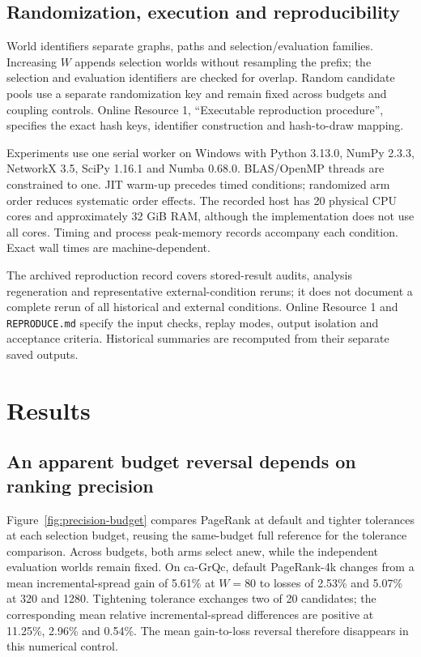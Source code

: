 \documentclass[smallextended]{svjour3}
\begin{document}
\subsection{Randomization, execution and reproducibility}
World identifiers separate graphs, paths and selection/evaluation families. Increasing $W$ appends selection worlds without resampling the prefix; the selection and evaluation identifiers are checked for overlap. Random candidate pools use a separate randomization key and remain fixed across budgets and coupling controls. Online Resource 1, ``Executable reproduction procedure'', specifies the exact hash keys, identifier construction and hash-to-draw mapping.

Experiments use one serial worker on Windows with Python 3.13.0, NumPy 2.3.3, NetworkX 3.5, SciPy 1.16.1 and Numba 0.68.0. BLAS/OpenMP threads are constrained to one. JIT warm-up precedes timed conditions; randomized arm order reduces systematic order effects. The recorded host has 20 physical CPU cores and approximately 32 GiB RAM, although the implementation does not use all cores. Timing and process peak-memory records accompany each condition. Exact wall times are machine-dependent.

The archived reproduction record covers stored-result audits, analysis regeneration and representative external-condition reruns; it does not document a complete rerun of all historical and external conditions. Online Resource 1 and \texttt{REPRODUCE.md} specify the input checks, replay modes, output isolation and acceptance criteria. Historical summaries are recomputed from their separate saved outputs.

\section{Results}
\subsection{An apparent budget reversal depends on ranking precision}
Figure~\ref{fig:precision-budget} compares PageRank at default and tighter tolerances at each selection budget, reusing the same-budget full reference for the tolerance comparison. Across budgets, both arms select anew, while the independent evaluation worlds remain fixed. On ca-GrQc, default PageRank-4k changes from a mean incremental-spread gain of 5.61\% at $W=80$ to losses of 2.53\% and 5.07\% at 320 and 1280. Tightening tolerance exchanges two of 20 candidates; the corresponding mean relative incremental-spread differences are positive at 11.25\%, 2.96\% and 0.54\%. The mean gain-to-loss reversal therefore disappears in this numerical control.
\end{document}
